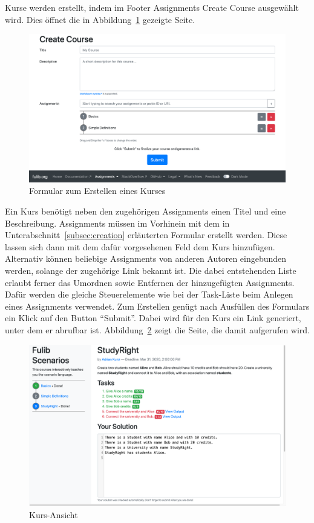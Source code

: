 Kurse werden erstellt, indem im Footer Assignments \textrightarrow{} Create Course ausgewählt wird.
Dies öffnet die in Abbildung~\ref{fig:create-course} gezeigte Seite.

\begin{figure}
    \centering
    \includegraphics[width=\textwidth]{chapter/fulib.org/img/create-course.png}
    \caption{Formular zum Erstellen eines Kurses}
    \label{fig:create-course}
\end{figure}

Ein Kurs benötigt neben den zugehörigen Assignments einen Titel und eine Beschreibung.
Assignments müssen im Vorhinein mit dem in Unterabschnitt~\ref{subsec:creation} erläuterten Formular erstellt werden.
Diese lassen sich dann mit dem dafür vorgesehenen Feld dem Kurs hinzufügen.
Alternativ können beliebige Assignments von anderen Autoren eingebunden werden,
solange der zugehörige Link bekannt ist.
Die dabei entstehenden Liste erlaubt ferner das Umordnen sowie Entfernen der hinzugefügten Assignments.
Dafür werden die gleiche Steuerelemente wie bei der Task-Liste beim Anlegen eines Assignments verwendet.
Zum Erstellen genügt nach Ausfüllen des Formulars ein Klick auf den Button ``Submit''.
Dabei wird für den Kurs ein Link generiert, unter dem er abrufbar ist.
Abbildung~\ref{fig:course-view} zeigt die Seite, die damit aufgerufen wird.

\begin{figure}
    \centering
    \includegraphics[width=\textwidth]{chapter/fulib.org/img/course-view.png}
    \caption{Kurs-Ansicht}
    \label{fig:course-view}
\end{figure}


